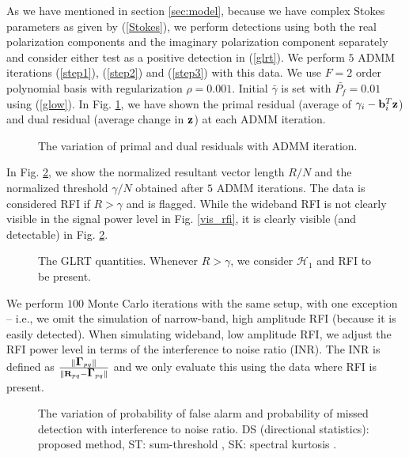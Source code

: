 \documentclass[conference]{IEEEtran}
\def\bmath#1{\mbox{\boldmath$#1$}}
\begin{document}
As we have mentioned in section \ref{sec:model}, because we have complex Stokes parameters as given by (\ref{Stokes}), we perform detections using both the real polarization components and the imaginary polarization component separately and consider either test as a positive detection in (\ref{glrt}). We perform $5$ ADMM iterations (\ref{step1}), (\ref{step2}) and (\ref{step3}) with this data. We use $F=2$ order polynomial basis with regularization $\rho=0.001$. Initial $\bar{\gamma}$ is set with $\bar{P_f}=0.01$ using (\ref{glow}). In Fig. \ref{primal_dual}, we have shown the primal residual (average of $\gamma_i - {\bf b}_i^T {\bf z}$) and dual residual (average change in ${\bf z}$) at each ADMM iteration.
\begin{figure}[htbp]
\begin{minipage}[b]{0.98\linewidth}
\centering
\centerline{}
\end{minipage}
\caption{The variation of primal and dual residuals with ADMM iteration.}
\label{primal_dual}
\end{figure}

In Fig. \ref{Rgamma}, we show the normalized resultant vector length $R/N$ and the normalized threshold $\gamma/N$ obtained after $5$ ADMM iterations. The data is considered RFI if $R>\gamma$ and is flagged. While the wideband RFI is not clearly visible in the signal power level in Fig. \ref{vis_rfi}, it is clearly visible (and detectable) in Fig. \ref{Rgamma}.
\begin{figure}[htbp]
\begin{minipage}[b]{0.98\linewidth}
\centering
\centerline{}
\end{minipage}
\caption{The GLRT quantities. Whenever $R>\gamma$, we consider $\mathcal{H}_1$ and RFI to be present.}
\label{Rgamma}
\end{figure}

We perform $100$ Monte Carlo iterations with the same setup, with one exception -- i.e., we omit the simulation of narrow-band, high amplitude RFI (because it is easily detected). When simulating wideband, low amplitude RFI, we adjust the RFI power level in terms of the interference to noise ratio (INR). The INR is defined as $\frac{\|{\bmath \Gamma}_{pq}\|}{\|{\bf R}_{pq}-{\bmath \Gamma}_{pq}\|}$ and we only evaluate this using the data where RFI is present.
\begin{figure}[htbp]
\begin{minipage}[b]{0.98\linewidth}
\centering
\centerline{}
\end{minipage}
\caption{The variation of probability of false alarm and probability of missed detection with interference to noise ratio. DS (directional statistics): proposed method, ST: sum-threshold \cite{aoflagger}, SK: spectral kurtosis \cite{SK2010}.}
\label{SIR}
\end{figure}
\end{document}
